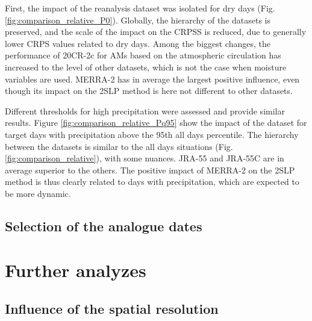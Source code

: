\documentclass{ametsoc}
\begin{document}
First, the impact of the reanalysis dataset was isolated for dry days (Fig. \ref{fig:comparison_relative_P0}). Globally, the hierarchy of the datasets is preserved, and the scale of the impact on the CRPSS is reduced, due to generally lower CRPS values related to dry days. Among the biggest changes, the performance of 20CR-2c for AMs based on the atmospheric circulation has increased to the level of other datasets, which is not the case when moisture variables are used. MERRA-2 has in average the largest positive influence, even though its impact on the 2SLP method is here not different to other datasets.

Different thresholds for high precipitation were assessed and provide similar results. Figure \ref{fig:comparison_relative_Pq95} show the impact of the dataset for target days with precipitation above the 95th all days percentile. The hierarchy between the datasets is similar to the all days situations (Fig. \ref{fig:comparison_relative}), with some nuances. JRA-55 and JRA-55C are in average superior to the others. The positive impact of MERRA-2 on the 2SLP method is thus clearly related to days with precipitation, which are expected to be more dynamic.


\subsection{Selection of the analogue dates}


\section{Further analyzes}
\label{sec:analyzes}

\subsection{Influence of the spatial resolution}
\end{document}
